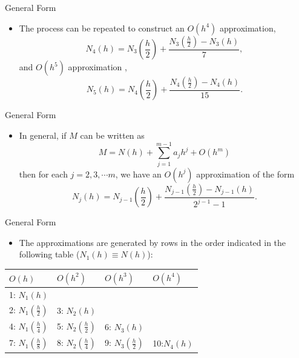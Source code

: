 \documentclass{beamer}
\begin{document}
\begin{frame}{General Form }
\begin{itemize}
\item The process can be repeated to construct an $O(h^4)$ approximation, 
\[
N_4(h)=N_3\left(\frac{h}{2}\right)+\frac{N_3\left(\frac{h}{2}\right)-N_3(h)}{7},
\]
and  $O(h^5)$ approximation ,
\[
N_5(h)=N_4\left(\frac{h}{2}\right)+\frac{N_4\left(\frac{h}{2}\right)-N_4(h)}{15}.
\]
\end{itemize}
\end{frame}
\begin{frame}{General Form }
\begin{itemize}
\item In general, if $M$ can be written as
\[
M=N(h)+\sum_{j=1}^{m-1} a_j h^j +O(h^m)
\]
then for each $j=2,3,\cdots m$, we have an $O(h^j)$ approximation of the form
\[
N_j(h)=N_{j-1}\left(\frac{h}{2}\right)+\frac{N_{j-1}\left(\frac{h}{2}\right)-N_{j-1}(h)}{2^{j-1}-1}.
\]
\end{itemize}
\end{frame}
\begin{frame}{General Form}
\begin{itemize}
\item The approximations are generated by rows in the order indicated in the following table ($N_1(h)\equiv N(h)$):
\end{itemize}
\begin{center}
\begin{tabular}{llll}
\hline
$O(h)$ & $O(h^2)$ & $O(h^3)$ & $O(h^4)$\\
\hline
1: $N_1(h) $ & & & \\
2: $N_1\left(\frac{h}{2}\right) $ & 3: $N_2(h)$ & & \\
4: $N_1\left(\frac{h}{4}\right) $ & 5: $N_2\left(\frac{h}{2}\right)$ & 6: $N_3(h)$& \\
7: $N_1\left(\frac{h}{8}\right) $ & 8: $N_2\left(\frac{h}{4}\right)$ & 9: $N_3\left(\frac{h}{2}\right)$& 10:$N_4(h)$\\
\hline

\end{tabular}
\end{center}
\end{frame}
\end{document}

